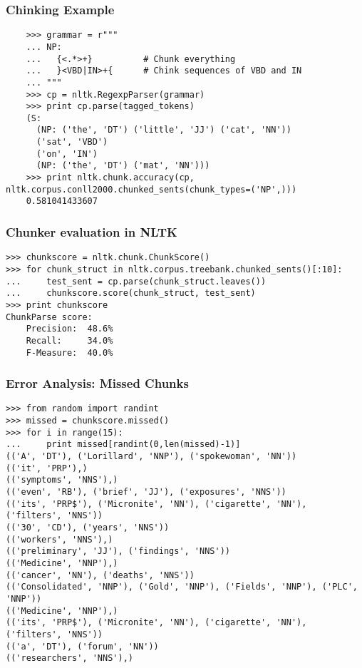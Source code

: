 \begin{frame}[fragile]
  \frametitle{Chinking Example}
  \scriptsize

\begin{lstlisting}
    >>> grammar = r"""
    ... NP:
    ...   {<.*>+}          # Chunk everything
    ...   }<VBD|IN>+{      # Chink sequences of VBD and IN
    ... """
    >>> cp = nltk.RegexpParser(grammar)
    >>> print cp.parse(tagged_tokens)
    (S:
      (NP: ('the', 'DT') ('little', 'JJ') ('cat', 'NN'))
      ('sat', 'VBD')
      ('on', 'IN')
      (NP: ('the', 'DT') ('mat', 'NN')))
    >>> print nltk.chunk.accuracy(cp, nltk.corpus.conll2000.chunked_sents(chunk_types=('NP',)))
    0.581041433607
\end{lstlisting}
\end{frame}


\begin{frame}[fragile]\frametitle{Chunker evaluation in NLTK}
  \scriptsize

\begin{lstlisting}
>>> chunkscore = nltk.chunk.ChunkScore()
>>> for chunk_struct in nltk.corpus.treebank.chunked_sents()[:10]:
...     test_sent = cp.parse(chunk_struct.leaves())
...     chunkscore.score(chunk_struct, test_sent)
>>> print chunkscore
ChunkParse score:
    Precision:  48.6%
    Recall:     34.0%
    F-Measure:  40.0%
\end{lstlisting}
\end{frame}

\begin{frame}[fragile]\frametitle{Error Analysis: Missed Chunks}
  \scriptsize

\begin{lstlisting}
>>> from random import randint
>>> missed = chunkscore.missed()
>>> for i in range(15):
...     print missed[randint(0,len(missed)-1)]
(('A', 'DT'), ('Lorillard', 'NNP'), ('spokewoman', 'NN'))
(('it', 'PRP'),)
(('symptoms', 'NNS'),)
(('even', 'RB'), ('brief', 'JJ'), ('exposures', 'NNS'))
(('its', 'PRP$'), ('Micronite', 'NN'), ('cigarette', 'NN'), ('filters', 'NNS'))
(('30', 'CD'), ('years', 'NNS'))
(('workers', 'NNS'),)
(('preliminary', 'JJ'), ('findings', 'NNS'))
(('Medicine', 'NNP'),)
(('cancer', 'NN'), ('deaths', 'NNS'))
(('Consolidated', 'NNP'), ('Gold', 'NNP'), ('Fields', 'NNP'), ('PLC', 'NNP'))
(('Medicine', 'NNP'),)
(('its', 'PRP$'), ('Micronite', 'NN'), ('cigarette', 'NN'), ('filters', 'NNS'))
(('a', 'DT'), ('forum', 'NN'))
(('researchers', 'NNS'),)
\end{lstlisting}
\end{frame}

